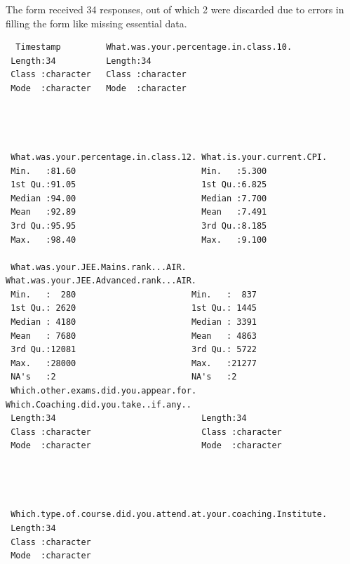 \documentclass[
  letterpaper,
  DIV=11,
  numbers=noendperiod]{scrartcl}
\begin{document}
The form received 34 responses, out of which 2 were discarded due to
errors in filling the form like missing essential data.

\begin{verbatim}
  Timestamp         What.was.your.percentage.in.class.10.
 Length:34          Length:34                            
 Class :character   Class :character                     
 Mode  :character   Mode  :character                     
                                                         
                                                         
                                                         
                                                         
 What.was.your.percentage.in.class.12. What.is.your.current.CPI.
 Min.   :81.60                         Min.   :5.300            
 1st Qu.:91.05                         1st Qu.:6.825            
 Median :94.00                         Median :7.700            
 Mean   :92.89                         Mean   :7.491            
 3rd Qu.:95.95                         3rd Qu.:8.185            
 Max.   :98.40                         Max.   :9.100            
                                                                
 What.was.your.JEE.Mains.rank...AIR. What.was.your.JEE.Advanced.rank...AIR.
 Min.   :  280                       Min.   :  837                         
 1st Qu.: 2620                       1st Qu.: 1445                         
 Median : 4180                       Median : 3391                         
 Mean   : 7680                       Mean   : 4863                         
 3rd Qu.:12081                       3rd Qu.: 5722                         
 Max.   :28000                       Max.   :21277                         
 NA's   :2                           NA's   :2                             
 Which.other.exams.did.you.appear.for. Which.Coaching.did.you.take..if.any..
 Length:34                             Length:34                            
 Class :character                      Class :character                     
 Mode  :character                      Mode  :character                     
                                                                            
                                                                            
                                                                            
                                                                            
 Which.type.of.course.did.you.attend.at.your.coaching.Institute.
 Length:34                                                      
 Class :character                                               
 Mode  :character                                               
                                                                

\end{verbatim}
\end{document}
